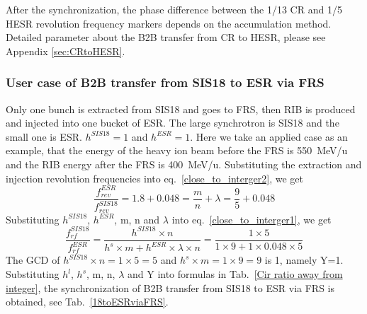 After the synchronization, the phase difference between the 1/13 CR and 1/5 HESR revolution frequency markers depends on the accumulation method. Detailed parameter about the B2B transfer from CR to HESR, please see Appendix \ref{sec:CRtoHESR}. 
\subsubsection{User case of B2B transfer from SIS18 to ESR via FRS} 
Only one bunch is extracted from SIS18 and goes to FRS, then RIB is produced and injected into one bucket of ESR. The large synchrotron is SIS18 and the small one is ESR. $h^{SIS18}=1$ and $h^{ESR}=1$. Here we take an applied case as an example, that the energy of the heavy ion beam before the FRS is \SI{550}{MeV/\atomicmassunit} and the RIB energy after the FRS is \SI{400}{MeV/\atomicmassunit}. Substituting the extraction and injection revolution frequencies into eq.~\ref{close_to_interger2}, we get
\begin{equation} 
\frac{f_{rev}^{ESR}}{f_{rev}^{SIS18}}=1.8+0.048=\frac{m}{n}+ \lambda=\frac{9}{5}+0.048
\end{equation}
Substituting $h^{SIS18}$, $h^{ESR}$, m, n and $\lambda$ into eq.~\ref{close_to_interger1}, we get
\begin{equation}
\frac{f_{rf}^{SIS18}}{f_{rf}^{ESR}}=\frac{h^{SIS18}\times n}{h^s \times m+ h^{ESR} \times\lambda\times n}=\frac{1\times 5}{1 \times 9+1 \times0.048\times 5}
\end{equation}
The GCD of $h^{SIS18}\times n=1\times5=5$ and $h^s \times m=1\times 9=9$ is 1, namely Y=1. Substituting $h^l$, $h^s$, m, n, $\lambda$ and Y into formulas in Tab.~\ref{Cir ratio away from integer}, the synchronization of B2B transfer from SIS18 to ESR via FRS is obtained, see Tab.~\ref{18toESRviaFRS}.
